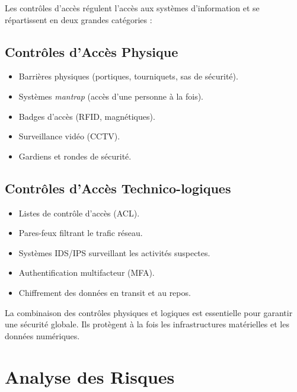 Les contrôles d'accès régulent l'accès aux systèmes d'information et se répartissent en deux grandes catégories :

\subsection{Contrôles d'Accès Physique}
\begin{itemize}
    \item Barrières physiques (portiques, tourniquets, sas de sécurité).
    \item Systèmes \og{}\textit{mantrap}\fg{} (accès d'une personne à la fois).
    \item Badges d'accès (RFID, magnétiques).
    \item Surveillance vidéo (CCTV).
    \item Gardiens et rondes de sécurité.
\end{itemize}

\subsection{Contrôles d'Accès Technico-logiques}
\begin{itemize}
    \item Listes de contrôle d'accès (ACL).
    \item Pares-feux filtrant le trafic réseau.
    \item Systèmes IDS/IPS surveillant les activités suspectes.
    \item Authentification multifacteur (MFA).
    \item Chiffrement des données en transit et au repos.
\end{itemize}

\begin{boxinfo}
La combinaison des contrôles physiques et logiques est essentielle pour garantir une sécurité globale. Ils protègent à la fois les infrastructures matérielles et les données numériques.
\end{boxinfo}

\section{Analyse des Risques}


